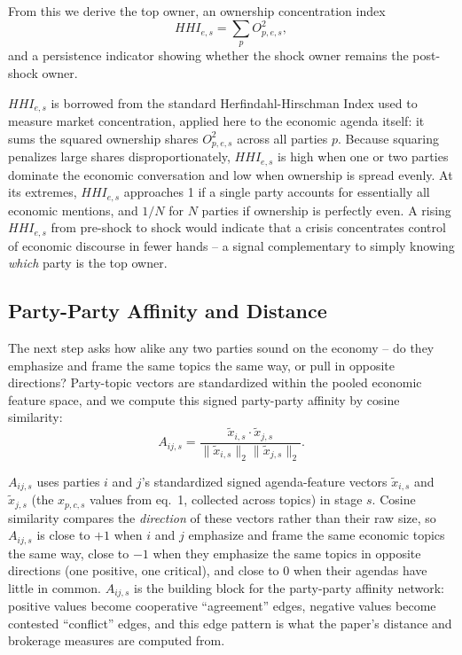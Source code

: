\documentclass[conference]{IEEEtran}
\begin{document}
From this we derive the top owner, an ownership concentration index
\begin{equation}
HHI_{e,s} = \sum_p O_{p,e,s}^2,
\end{equation}
and a persistence indicator showing whether the shock owner remains the post-shock owner.

$HHI_{e,s}$ is borrowed from the standard Herfindahl-Hirschman Index used to measure market concentration, applied here to the economic agenda itself: it sums the squared ownership shares $O_{p,e,s}^2$ across all parties $p$. Because squaring penalizes large shares disproportionately, $HHI_{e,s}$ is high when one or two parties dominate the economic conversation and low when ownership is spread evenly. At its extremes, $HHI_{e,s}$ approaches 1 if a single party accounts for essentially all economic mentions, and $1/N$ for $N$ parties if ownership is perfectly even. A rising $HHI_{e,s}$ from pre-shock to shock would indicate that a crisis concentrates control of economic discourse in fewer hands -- a signal complementary to simply knowing \emph{which} party is the top owner.

\subsection{Party-Party Affinity and Distance}
The next step asks how alike any two parties sound on the economy -- do they emphasize and frame the same topics the same way, or pull in opposite directions? Party-topic vectors are standardized within the pooled economic feature space, and we compute this signed party-party affinity by cosine similarity:
\begin{equation}
A_{ij,s} =
\frac{\tilde{x}_{i,s}\cdot\tilde{x}_{j,s}}
{\|\tilde{x}_{i,s}\|_2 \|\tilde{x}_{j,s}\|_2}.
\end{equation}

$A_{ij,s}$ uses parties $i$ and $j$'s standardized signed agenda-feature vectors $\tilde{x}_{i,s}$ and $\tilde{x}_{j,s}$ (the $x_{p,c,s}$ values from eq.~1, collected across topics) in stage $s$. Cosine similarity compares the \emph{direction} of these vectors rather than their raw size, so $A_{ij,s}$ is close to $+1$ when $i$ and $j$ emphasize and frame the same economic topics the same way, close to $-1$ when they emphasize the same topics in opposite directions (one positive, one critical), and close to 0 when their agendas have little in common. $A_{ij,s}$ is the building block for the party-party affinity network: positive values become cooperative ``agreement'' edges, negative values become contested ``conflict'' edges, and this edge pattern is what the paper's distance and brokerage measures are computed from.
\end{document}

